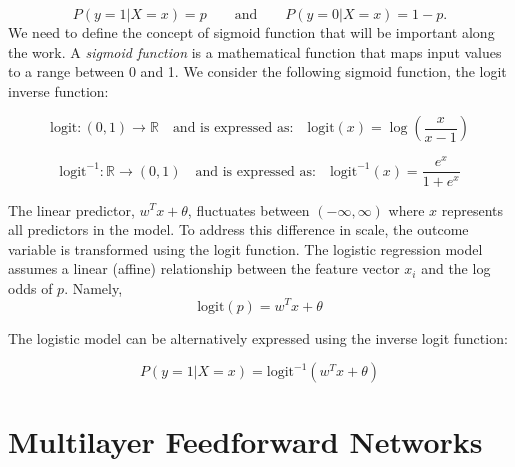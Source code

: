 \documentclass[../main.tex]{subfiles}
\begin{document}
\[P(y = 1 | X = x) = p 
\qquad  \text{and}
\qquad
P(y = 0 | X = x) = 1-p. \]
We need to define the concept of sigmoid function that will be important along the work. A \textit{sigmoid function} is a mathematical function that maps input values to a range between 0 and 1. We consider the following sigmoid function, the logit inverse function:

\[
\text{logit}: (0,1) \to \mathbb{R}
\quad \text{and is expressed as:} \quad
\text{logit}(x) = \log\left(\frac{x}{x-1}\right)
\]


\[
\text{logit}^{-1}: \mathbb{R} \to (0,1)
\quad \text{and is expressed as:} \quad
\text{logit}^{-1}(x) = \frac{e^x}{1+e^x}
\]

\noindent The linear predictor, $ w^T x +\theta$, fluctuates between $(-\infty,\infty)$ where $x$ represents all predictors in the model. To address this difference in scale, the outcome variable is transformed using the logit function. The logistic regression model assumes a linear (affine) relationship between the feature vector $x_i$ and the log odds of $p$. Namely,
$$\text{logit}(p) = w^T x +\theta$$

\noindent The logistic model can be alternatively expressed using the inverse logit function:

\[
P(y = 1 | X=x) = \text{logit}^{-1}(w^T x +\theta)
\]




\section{Multilayer Feedforward Networks}
	
\end{document}

